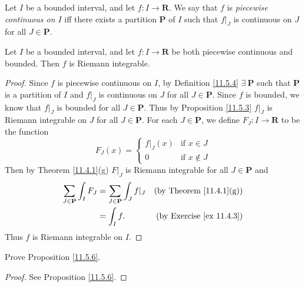\begin{definition}\label{11.5.4}
    Let \(I\) be a bounded interval, and let \(f : I \to \mathbf{R}\).
    We say that \(f\) is \emph{piecewise continuous on \(I\)} iff there exists a partition \(\mathbf{P}\) of \(I\) such that \(f|_J\) is continuous on \(J\) for all \(J \in \mathbf{P}\).
\end{definition}

\setcounter{theorem}{5}
\begin{proposition}\label{11.5.6}
    Let \(I\) be a bounded interval, and let \(f : I \to \mathbf{R}\) be both piecewise continuous and bounded.
    Then \(f\) is Riemann integrable.
\end{proposition}

\begin{proof}
    Since \(f\) is piecewise continuous on \(I\), by Definition \ref{11.5.4} \(\exists\ \mathbf{P}\) such that \(\mathbf{P}\) is a partition of \(I\) and \(f|_J\) is continuous on \(J\) for all \(J \in \mathbf{P}\).
    Since \(f\) is bounded, we know that \(f|_J\) is bounded for all \(J \in \mathbf{P}\).
    Thus by Proposition \ref{11.5.3} \(f|_J\) is Riemann integrable on \(J\) for all \(J \in \mathbf{P}\).
    For each \(J \in \mathbf{P}\), we define \(F_J : I \to \mathbf{R}\) to be the function
    \[
        F_J(x) = \begin{cases}
            f|_J(x) & \text{if } x \in J    \\
            0       & \text{if } x \notin J
        \end{cases}
    \]
    Then by Theorem \ref{11.4.1}(g) \(F|_J\) is Riemann integrable for all \(J \in \mathbf{P}\) and
    \begin{align*}
        \sum_{J \in \mathbf{P}} \int_I F_J & = \sum_{J \in \mathbf{P}} \int_J f|_J & \text{(by Theorem \ref{11.4.1}(g))}  \\
                                           & = \int_I f.                           & \text{(by Exercise \ref{ex 11.4.3})}
    \end{align*}
    Thus \(f\) is Riemann integrable on \(I\).
\end{proof}

\exercisesection

\begin{exercise}\label{ex 11.5.1}
    Prove Proposition \ref{11.5.6}.
\end{exercise}

\begin{proof}
    See Proposition \ref{11.5.6}.
\end{proof}